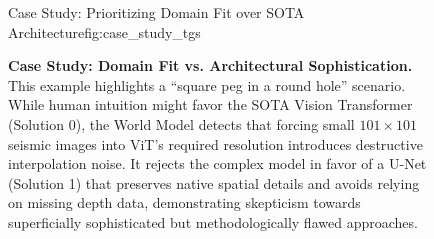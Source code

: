 \begin{figure}[b]
\begin{CaseStudyFrame}{Case Study: Prioritizing Domain Fit over SOTA Architecture}{fig:case_study_tgs}
    \end{CaseStudyFrame}
    
    \caption{\textbf{Case Study: Domain Fit vs. Architectural Sophistication.} This example highlights a ``square peg in a round hole'' scenario. While human intuition might favor the SOTA Vision Transformer (Solution 0), the World Model detects that forcing small $101 \times 101$ seismic images into ViT's required resolution introduces destructive interpolation noise. It rejects the complex model in favor of a U-Net (Solution 1) that preserves native spatial details and avoids relying on missing depth data, demonstrating skepticism towards superficially sophisticated but methodologically flawed approaches.}
    \label{fig:case_study_tgs}
\end{figure}




